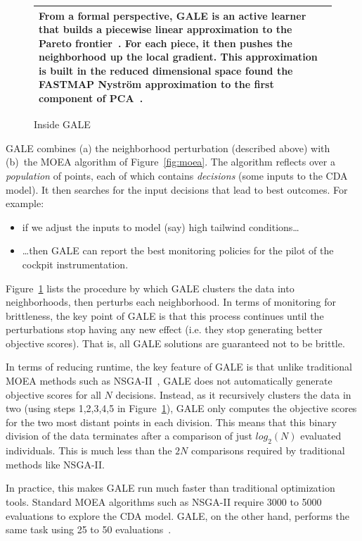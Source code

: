 \documentclass{sig-alternative}
\newcommand{\fig}[1]{Figure~\ref{fig:#1}}
\begin{document}
\begin{figure}[!b]
\begin{tabular}{|p{.95\linewidth}|}
From a formal perspective, GALE is an active learner~\cite{Dasgupta2005} that builds a piecewise linear approximation to the Pareto frontier~\cite{Zuluaga:13}.  For each piece, it then pushes the neighborhood up the local gradient.  This  approximation is built in the reduced dimensional space found the FASTMAP  Nystr\"om approximation to the first component of PCA~\cite{platt05}.
\\\hline
\end{tabular}
\caption{Inside GALE}\label{fig:gale}
\end{figure}
GALE combines (a) the neighborhood perturbation (described above)  with (b)~the MOEA algorithm of \fig{moea}.  The algorithm reflects over a {\em population} of points, each of which contains {\em decisions} (some inputs to the CDA model).  It then searches for the input decisions that lead to best outcomes.  For example:
\begin{itemize}
\item if we adjust the inputs to model (say) high tailwind conditions\ldots
\item \ldots then GALE can report the best monitoring policies for the pilot of the cockpit instrumentation.
\end{itemize}

\fig{gale} lists the procedure by which GALE clusters the data into neighborhoods, then perturbs each neighborhood.  In terms of monitoring for brittleness, the key point of GALE is that this process continues until the perturbations stop having any new effect (i.e. they stop generating better objective scores). That is, all GALE solutions are guaranteed not to be brittle.


In terms of reducing runtime, the key feature of GALE is that unlike traditional MOEA methods such as NSGA-II~\cite{deb00afast}, GALE  does not automatically generate objective scores for all $N$ decisions.  Instead, as it recursively clusters the data in two (using steps 1,2,3,4,5 in \fig{gale}), GALE only computes the objective scores for the two most distant points in each division.  This means that this binary division of the data terminates after a comparison of just $log_2(N)$ evaluated individuals. This is much less than the $2N$ comparisons required by  traditional methods like NSGA-II.

In practice, this makes GALE run much faster than traditional optimization tools.  Standard MOEA algorithms such as NSGA-II require 3000 to 5000 evaluations to explore the CDA model. GALE, on the other hand, performs the same task using 25 to 50 evaluations~\cite{krallphd}. 
\end{document}
